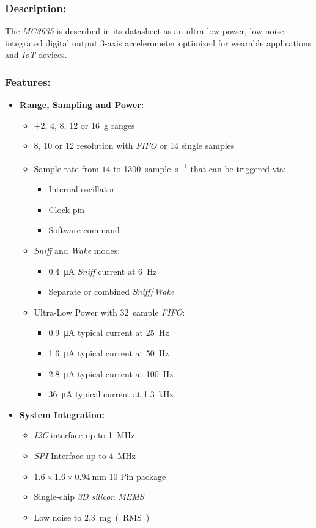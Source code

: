 \documentclass[report.tex]{subfiles}
\begin{document}
\subsubsection{Description:}

The \textit{MC3635}\cite{MC3635} is described in its datasheet as an ultra-low power, low-noise, integrated digital output 3-axis accelerometer optimized for wearable applications and \textit{IoT} devices.

\subsubsection{Features:}

\begin{itemize}
\item \textbf{Range, Sampling and Power:}
\begin{itemize}
\item $\pm$2, 4, 8, 12 or \SI{16}{\g} ranges
\item 8, 10 or \SI{12}{\bit} resolution with \textit{FIFO} or \SI{14}{\bit} single samples
\item Sample rate from $14$ to \SI{1300}{sample\per\second} that can be triggered via:
\begin{itemize}
\item Internal oscillator
\item Clock pin
\item Software command
\end{itemize}
\item \textit{Sniff} and \textit{Wake} modes:
\begin{itemize}
\item \SI{0.4}{\micro\ampere} \textit{Sniff} current at \SI{6}{\hertz}
\item Separate or combined \textit{Sniff}/\textit{Wake}
\end{itemize}
\item Ultra-Low Power with \SI{32}{sample} \textit{FIFO}:
\begin{itemize}
\item \SI{0.9}{\micro\ampere} typical current at \SI{25}{\hertz}
\item \SI{1.6}{\micro\ampere} typical current at \SI{50}{\hertz}
\item \SI{2.8}{\micro\ampere} typical current at \SI{100}{\hertz}
\item \SI{36}{\micro\ampere} typical current at \SI{1.3}{\kilo\hertz}
\end{itemize}
\end{itemize}
\item \textbf{System Integration:}
\begin{itemize}
\item \textit{I2C} interface up to \SI{1}{\mega\hertz}
\item \textit{SPI} Interface up to \SI{4}{\mega\hertz}
\item $1.6 \times 1.6 \times \SI{0.94}{\milli\meter}$ 10 Pin package
\item Single-chip \textit{3D silicon MEMS}
\item Low noise to \SI{2.3}{\milli\g (RMS)}
\end{itemize}
\end{itemize}
\end{document}
